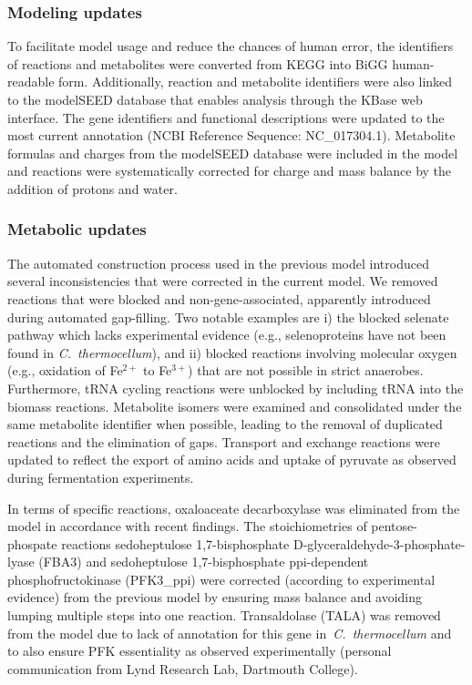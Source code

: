 \subsubsection{Modeling updates}
To facilitate model usage and reduce the chances of human error, the identifiers of reactions and metabolites were converted from KEGG into BiGG human-readable form.\citep{king2015}
Additionally, reaction and metabolite identifiers were also linked to the modelSEED database \citep{henry2010} that enables analysis through the KBase web interface. \citep{arkin2018}
The gene identifiers and functional descriptions were updated to the most current annotation (NCBI Reference Sequence: NC\_017304.1). %
Metabolite formulas and charges from the modelSEED database\citep{henry2010} were included in the model and reactions were systematically corrected for charge and mass balance by the addition of protons and water.


\subsubsection{Metabolic updates}

The automated construction process used in the previous model introduced several inconsistencies that were corrected in the current model. We removed reactions that were blocked and non-gene-associated, apparently introduced during automated gap-filling. Two notable examples are i) the blocked selenate pathway which lacks experimental evidence (e.g., selenoproteins have not been found in \textit{C.~thermocellum}), and ii) blocked reactions involving molecular oxygen (e.g., oxidation of Fe$^{2+}$ to Fe$^{3+}$) that are not possible in strict anaerobes. Furthermore, tRNA cycling reactions were unblocked by including tRNA into the biomass reactions.\citep{reimers2017}
Metabolite isomers were examined and consolidated under the same metabolite identifier when possible, leading to the removal of duplicated reactions and the elimination of gaps.
Transport and exchange reactions were updated to reflect the export of amino acids and uptake of pyruvate as observed during fermentation experiments.\citep{holwerda2014}

In terms of specific reactions, oxaloaceate decarboxylase was eliminated from the model in accordance with recent findings.\citep{olson2017}
The stoichiometries of pentose-phospate reactions sedoheptulose 1,7-bisphosphate D-glyceraldehyde-3-phosphate-lyase (FBA3) and sedoheptulose 1,7-bisphosphate ppi-dependent phosphofructokinase (PFK3\_ppi) were corrected (according to experimental evidence\citep{rydzak2012}) from the previous model by ensuring mass balance and avoiding lumping multiple steps into one reaction.
Transaldolase (TALA) was removed from the model due to lack of annotation for this gene in \textit{C.~thermocellum} and to also ensure PFK essentiality as observed experimentally (personal communication from Lynd Research Lab, Dartmouth College).

